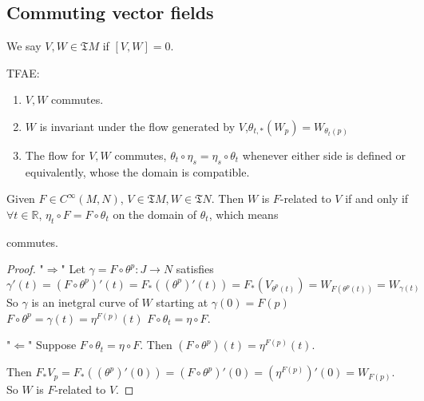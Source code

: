  \subsection{Commuting vector fields}
 \begin{definition}
    We say  $ V,W\in\mathfrak{T}M $  if  $ [V,W]=0 $.  
 \end{definition}
 \begin{theorem}\label{Equivalent condition of Commuting vector fields}
    TFAE:
    \begin{enumerate}
        \item  $ V,W $ commutes.
        \item   $ W $ is invariant under the flow generated by  $ V $,\ie  $ \theta_{t,*}(W_p)=W_{\theta_t(p)} $
        \item The flow for  $ V,W $ commutes, \ie  $ \theta_t\circ \eta_s=\eta_s\circ \theta_t $ whenever either side is defined or equivalently, whose the domain is compatible.     
    \end{enumerate}
 \end{theorem}
 \begin{lemma}
     Given  $ F\in C^\infty(M,N) $,  $ V\in\mathfrak{T}M ,W\in \mathfrak{T}N$. Then  $ W $ is  $ F $-related to  $ V $ if and only  if  $ \forall t\in \mathbb{R} $,  $ \eta_t\circ F=F\circ \theta_t $ on the domain of  $ \theta_t $, which means 
    {\begin{center}
        commutes.
    \end{center}
    
     }
      
 \end{lemma}
 \begin{proof}
    "$ \Rightarrow $" Let  $ \gamma=F\circ \theta^p:J\rightarrow N $ satisfies 
     \[\gamma'(t)=(F\circ \theta^p)'(t)=F_*((\theta^p)'(t))=F_*(V_{\theta^p(t)})=W_{F(\theta^p(t))}=W_{\gamma(t)}\]
     So  $ \gamma $ is an inetgral curve of  $ W $ starting at  $ \gamma(0)=F(p) $\ie  $ F\circ \theta^p =\gamma(t)=\eta^{F(p)}(t)$ \ie  $ F\circ \theta_t=\eta\circ F $.
     
     "$ \Leftarrow $" Suppose  $ F\circ \theta_t =\eta\circ F $. Then   $ (F\circ \theta^p)(t)=\eta^{F(p)}(t) $.
     
     Then  $ F_*V_p=F_*((\theta^p)'(0))=(F\circ \theta^p)'(0)=(\eta^{F(p)})'(0)=W_{F(p)} $. So  $ W $ is  $ F $-related to  $ V $.   
 \end{proof}
